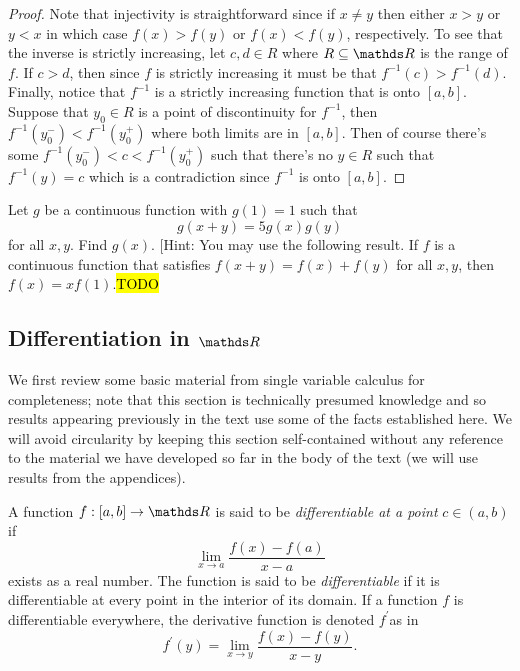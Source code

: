 \begin{proof}
Note that injectivity is straightforward since if $x\neq y$ then
either $x>y$ or $y<x$ in which case $f\left(x\right)>f\left(y\right)$
or $f\left(x\right)<f\left(y\right)$, respectively. To see that the
inverse is strictly increasing, let $c,d\in R$ where $R\subseteq\R$
is the range of $f$. If $c>d$, then since $f$ is strictly increasing
it must be that $f^{-1}\left(c\right)>f^{-1}\left(d\right)$. Finally,
notice that $f^{-1}$ is a strictly increasing function that is onto
$\left[a,b\right]$. Suppose that $y_{0}\in R$ is a point of discontinuity
for $f^{-1}$, then $f^{-1}\left(y_{0}^{-}\right)<f^{-1}\left(y_{0}^{+}\right)$
where both limits are in $\left[a,b\right].$ Then of course there's
some $f^{-1}\left(y_{0}^{-}\right)<c<f^{-1}\left(y_{0}^{+}\right)$
such that there's no $y\in R$ such that $f^{-1}\left(y\right)=c$
which is a contradiction since $f^{-1}$ is onto $\left[a,b\right].$
\end{proof}
\begin{example}
\label{exa:isi2008samplepsb3} Let $g$ be a continuous function with
$g(1)=1$ such that 
\[
g(x+y)=5g(x)g(y)
\]
 for all $x,y$. Find $g(x)$. {[}Hint: You may use the following
result. If $f$ is a continuous function that satisfies $f(x+y)=f(x)+f(y)$
for all $x,y$, then $f(x)=xf(1)$.\hl{TODO}
\end{example}


\subsection{Differentiation in $\R$\label{subsec:reviewDifferentiation}}

We first review some basic material from single variable calculus
for completeness; note that this section is technically presumed knowledge
and so results appearing previously in the text use some of the facts
established here. We will avoid circularity by keeping this section
self-contained without any reference to the material we have developed
so far in the body of the text (we will use results from the appendices).
\begin{defn}
	\label{def:differentiable}A function $f:\left[a,b\right]\to\R$ is
	said to be \emph{differentiable at a point }$c\in\left(a,b\right)$
	if 
	\[
	\lim_{x\to a}\frac{f\left(x\right)-f\left(a\right)}{x-a}
	\]
	exists as a real number. The function is said to be \emph{differentiable
	}if it is differentiable at every point in the interior of its domain.
	If a function $f$ is differentiable everywhere, the derivative function
	is denoted $f^{\prime}$as in 
	\[
	f^{\prime}\left(y\right)=\lim_{x\to y}\frac{f\left(x\right)-f\left(y\right)}{x-y}.
	\]
\end{defn}

